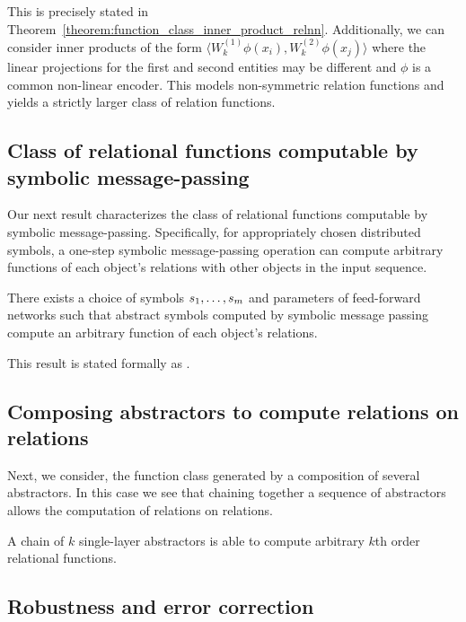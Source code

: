 This is precisely stated in Theorem~\ref{theorem:function_class_inner_product_relnn}. 
Additionally, we can consider inner products of the form
$\langle W_k^{(1)} \phi(x_i), W_k^{(2)} \phi(x_j) \rangle$
where the linear projections for the first and second entities may be different and $\phi$ is a common non-linear encoder. This models non-symmetric relation functions and yields a strictly larger class of relation functions.

\subsection{Class of relational functions computable by symbolic message-passing}

Our next result characterizes the class of relational functions computable by symbolic message-passing.
Specifically, for appropriately chosen distributed symbols, 
a one-step symbolic message-passing operation can compute arbitrary functions of each object's relations with other objects in the input sequence. 

\begin{result}
    There exists a choice of symbols \(s_1, \ldots, s _m\) and parameters of feed-forward networks such that abstract symbols computed by symbolic message passing compute an arbitrary function of each object's relations.
\end{result}

This result is stated formally as .

\subsection{Composing  abstractors to compute relations on relations}\label{ssec:compsing_abstractors_preview}

Next, we consider, the function class generated by a composition of several abstractors. In this case we see that chaining together a sequence of  abstractors allows the computation of relations on relations.

\begin{result}
A chain of \(k\) single-layer  abstractors is able to compute arbitrary \(k\)th order relational functions.
\end{result}

\subsection{Robustness and error correction}

